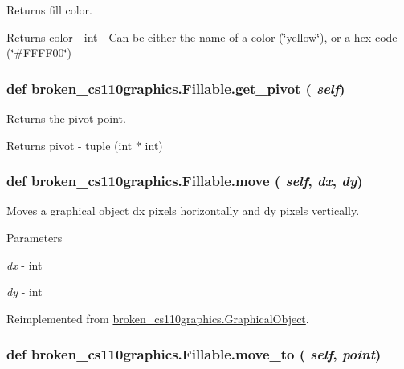 Returns fill color. \begin{DoxyReturn}{Returns}
color -\/ int -\/ Can be either the name of a color (\char`\"{}yellow\char`\"{}), or a hex code (\char`\"{}\#FFFF00\char`\"{}) 
\end{DoxyReturn}
\hypertarget{classbroken__cs110graphics_1_1Fillable_ad5073b750f9d2a7678aa311821b9e4d1}{
\subsubsection[{get\_\-pivot}]{\setlength{\rightskip}{0pt plus 5cm}def broken\_\-cs110graphics.Fillable.get\_\-pivot ( {\em self})}}
\label{classbroken__cs110graphics_1_1Fillable_ad5073b750f9d2a7678aa311821b9e4d1}


Returns the pivot point. \begin{DoxyReturn}{Returns}
pivot -\/ tuple (int $\ast$ int) 
\end{DoxyReturn}
\hypertarget{classbroken__cs110graphics_1_1Fillable_ae0a64b349be4d163ccf5759cf3d7f0bb}{
\subsubsection[{move}]{\setlength{\rightskip}{0pt plus 5cm}def broken\_\-cs110graphics.Fillable.move ( {\em self}, \/   {\em dx}, \/   {\em dy})}}
\label{classbroken__cs110graphics_1_1Fillable_ae0a64b349be4d163ccf5759cf3d7f0bb}


Moves a graphical object dx pixels horizontally and dy pixels vertically. 
\begin{DoxyParams}{Parameters}
\item[{\em dx}]-\/ int \item[{\em dy}]-\/ int \end{DoxyParams}


Reimplemented from \hyperlink{classbroken__cs110graphics_1_1GraphicalObject_aebbdd098df38319fa08db41caad93282}{broken\_\-cs110graphics.GraphicalObject}.\hypertarget{classbroken__cs110graphics_1_1Fillable_ae7f8de11eb7e2fa1cebea3e978e1c3f0}{
\subsubsection[{move\_\-to}]{\setlength{\rightskip}{0pt plus 5cm}def broken\_\-cs110graphics.Fillable.move\_\-to ( {\em self}, \/   {\em point})}}
\label{classbroken__cs110graphics_1_1Fillable_ae7f8de11eb7e2fa1cebea3e978e1c3f0}


